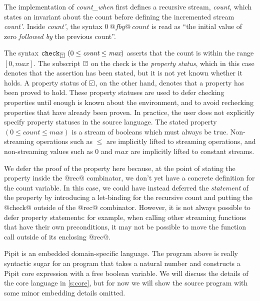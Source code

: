 The implementation of \emph{count_when} first defines a recursive stream, \emph{count}, which states an invariant about the count before defining the incremented stream \emph{count'}.
Inside \emph{count'}, the syntax $0~@fby@~\textit{count}$ is read as ``the initial value of zero \emph{followed by} the previous count''.

The syntax $\xcheckP{\PSUnknown}{(0 \le \textit{count} \le \textit{max})}$ asserts that the count is within the range $[0, \textit{max}]$.
The subscript $\PSUnknown$ on the check is the \emph{property status}, which in this case denotes that the assertion has been stated, but it is not yet known whether it holds.
A property status of $\PSValid$, on the other hand, denotes that a property has been proved to hold.
These property statuses are used to defer checking properties until enough is known about the environment, and to avoid rechecking properties that have already been proven.
In practice, the user does not explicitly specify property statuses in the source language.
The stated property $(0 \le \textit{count} \le \textit{max})$ is a stream of booleans which must always be true.
Non-streaming operations such as $\le$ are implicitly lifted to streaming operations, and non-streaming values such as $0$ and $\textit{max}$ are implicitly lifted to constant streams.

We defer the proof of the property here because, at the point of stating the property inside the @rec@ combinator, we don't yet have a concrete definition for the count variable.
In this case, we could have instead deferred the \emph{statement} of the property by introducing a let-binding for the recursive count and putting the @check@ outside of the @rec@ combinator.
However, it is not always possible to defer property statements: for example, when calling other streaming functions that have their own preconditions, it may not be possible to move the function call outside of its enclosing @rec@.

Pipit is an embedded domain-specific language.
The program above is really syntactic sugar for an \fstar{} program that takes a natural number and constructs a Pipit core expression with a free boolean variable.
We will discuss the details of the core language in \autoref{s:core}, but for now we will show the source program with some minor embedding details omitted.

